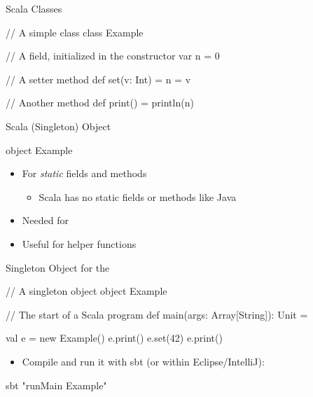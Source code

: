 \begin{frame}[fragile]{Scala Classes}
\begin{chisel}
// A simple class
class Example {
  // A field, initialized in the constructor
  var n = 0

  // A setter method
  def set(v: Int) = {
    n = v
  }

  // Another method
  def print() = {
    println(n)
  }
}
\end{chisel}
\end{frame}

\begin{frame}[fragile]{Scala (Singleton) Object}
\begin{chisel}
object Example {}
\end{chisel}
\begin{itemize}
\item For \emph{static} fields and methods
\begin{itemize}
\item Scala has no static fields or methods like Java
\end{itemize}
\item Needed for 
\item Useful for helper functions
\end{itemize}
\end{frame}

\begin{frame}[fragile]{Singleton Object for the }
\begin{chisel}
// A singleton object
object Example {

  // The start of a Scala program
  def main(args: Array[String]): Unit = {

    val e = new Example()
    e.print()
    e.set(42)
    e.print()
  }
}
\end{chisel}
\begin{itemize}
\item Compile and run it with sbt (or within Eclipse/IntelliJ):
\end{itemize}
\begin{chisel}
sbt "runMain Example"
\end{chisel}
\end{frame}







